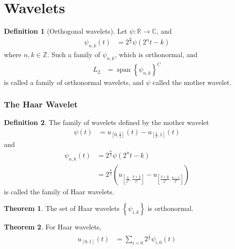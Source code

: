 \documentclass[titlepage, fleqn, a4paper, 12pt, twoside]{article}
\theoremstyle{definition}
\newtheorem{definition}{Definition}
\theoremstyle{theorem}
\newtheorem{theorem}{Theorem}
\DeclareMathOperator{\vspan}{\mathrm{span}}
\begin{document}
\clearpage
\part{Wavelets}

\begin{definition}[Orthogonal wavelets]
	Let $\psi: \mathbb{R} \to \mathbb{C}$, and
	\begin{align*}
		\psi_{n,k}(t) &= 2^{\frac{n}{2}} \psi\left( 2^n t - k \right)
	\end{align*}
	where $n, k \in \mathbb{Z}$.
	Such a family of $\psi_{n,k}$, which is orthonormal, and
	\begin{align*}
		L_2 &= {\vspan{\left\{ \psi_{n,k} \right\}}}^{C}
	\end{align*}
	is called a family of orthonormal wavelets, and $\psi$ called the mother wavelet.
\end{definition}

\section{The Haar Wavelet}

\begin{definition}
	The family of wavelets defined by the mother wavelet
	\begin{align*}
		\psi(t) &= u_{\left[ 0, \frac{1}{2} \right]}(t) - u_{\left[ \frac{1}{2},1 \right]}(t)
	\end{align*}
	and
	\begin{align*}
		\psi_{n,k}(t) &= 2^{\frac{n}{2}} \psi\left( 2^n t - k \right)\\
		&= 2^{\frac{n}{2}} \left( u_{\left[ \frac{k}{2^n} , \frac{k + \frac{1}{2}}{2^n} \right]} - u_{\left[ \frac{k + \frac{1}{2}}{2^n} , \frac{k + 1}{2^n} \right]} \right)
	\end{align*}
	is called the family of Haar wavelets.
\end{definition}

\begin{theorem}
	The set of Haar wavelets $\left\{ \psi_{i,k} \right\}$ is orthonormal.
\end{theorem}

\begin{theorem}
	For Haar wavelets,
	\begin{align*}
		u_{[0,1]}(t) &= \sum\limits_{i < 0} 2^{\frac{i}{2}} \psi_{i,0}(t)
	\end{align*}
\end{theorem}
\end{document}
